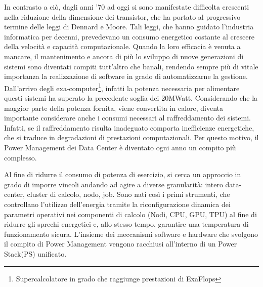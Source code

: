 In contrasto a ciò, dagli anni '70 ad oggi si sono manifestate difficolta crescenti nella riduzione della dimensione dei transistor, che ha portato al progressivo termine delle leggi di Dennard e Moore\cite{Dennardsscaling}\cite{Dennardsscaling2}. Tali leggi, che hanno guidato l'industria informatica per decenni, prevedevano un consumo energetico costante al crescere della velocità e capacità computazionale. Quando la loro efficacia è venuta a mancare, il mantenimento e ancora di più lo sviluppo di nuove generazioni di sistemi sono diventati compiti tutt'altro che banali\cite{growth}, rendendo sempre più di vitale importanza la realizzazione di software in grado di automatizzarne la gestione.
Dall'arrivo degli exa-computer\footnote{Supercalcolatore in grado che raggiunge prestazioni di ExaFlops}, infatti la potenza necessaria per alimentare questi sistemi ha superato la precedente soglia dei 20MWatt\cite{TOP500}. Considerando che la maggior parte della potenza fornita, viene convertita in calore, diventa importante considerare anche i consumi necessari al raffreddamento dei sistemi. Infatti, se il raffreddamento risulta inadeguato comporta inefficienze energetiche, che si traduce in degradazioni di prestazioni computazionali.
Per questo motivo, il Power Management dei Data Center è diventato ogni anno un compito più complesso. %

Al fine di ridurre il consumo di potenza di esercizio, si cerca un approccio in grado di imporre vincoli andando ad agire a diverse granularità: intero data-center, cluster di calcolo, nodo, job. 
Sono nati così i primi strumenti, che controllano l'utilizzo dell'energia tramite la riconfigurazione dinamica dei parametri operativi nei componenti di calcolo (Nodi, CPU, GPU, TPU) al fine di ridurre gli sprechi energetici e, allo stesso tempo, garantire una temperatura di funzionamento sicura. %
L'insieme dei meccanismi software e hardware che svolgono il compito di Power Management vengono racchiusi all'interno di un Power Stack(PS) unificato. %


